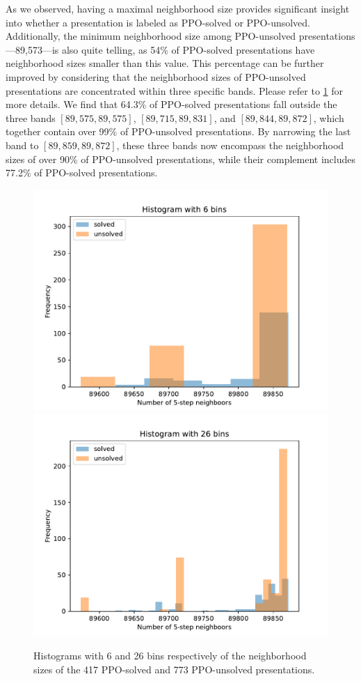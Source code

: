 As we observed, having a maximal neighborhood size provides significant insight into whether a presentation is labeled as PPO-solved or PPO-unsolved.
Additionally, the minimum neighborhood size among PPO-unsolved presentations—89,573—is also quite telling, as 54\% of PPO-solved presentations have neighborhood sizes smaller than this value.
This percentage can be further improved by considering that the neighborhood sizes of PPO-unsolved presentations are concentrated within three specific bands.
Please refer to \cref{fig:prime_histogram} for more details.
We find that 64.3\% of PPO-solved presentations fall outside the three bands \([89,575, 89,575]\), \([89,715, 89,831]\), and \([89,844, 89,872]\), which together contain over 99\% of PPO-unsolved presentations.
By narrowing the last band to \([89,859, 89,872]\), these three bands now encompass the neighborhood sizes of over 90\% of PPO-unsolved presentations, while their complement includes 77.2\% of PPO-solved presentations.

\begin{figure}
	\centering
	\includegraphics[scale=.34]{fig/prime_histogram_rl.pdf}
	\includegraphics[scale=.34]{fig/prime_histogram_rl2.pdf}
	\caption{Histograms with 6 and 26 bins respectively of the neighborhood sizes of the 417 PPO-solved and 773 PPO-unsolved presentations.}
	\label{fig:prime_histogram}
\end{figure}


